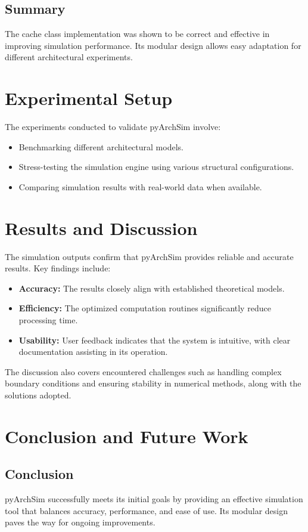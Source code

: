 \documentclass[12pt,a4paper]{report}
\begin{document}
\subsection{Summary}
The cache class implementation was shown to be correct and effective in improving simulation performance. Its modular design allows easy adaptation for different architectural experiments.

\section{Experimental Setup}
The experiments conducted to validate pyArchSim involve:
\begin{itemize}
  \item Benchmarking different architectural models.
  \item Stress-testing the simulation engine using various structural configurations.
  \item Comparing simulation results with real-world data when available.
\end{itemize}

\section{Results and Discussion}
The simulation outputs confirm that pyArchSim provides reliable and accurate results. Key findings include:
\begin{itemize}
  \item \textbf{Accuracy:} The results closely align with established theoretical models.
  \item \textbf{Efficiency:} The optimized computation routines significantly reduce processing time.
  \item \textbf{Usability:} User feedback indicates that the system is intuitive, with clear documentation assisting in its operation.
\end{itemize}

The discussion also covers encountered challenges such as handling complex boundary conditions and ensuring stability in numerical methods, along with the solutions adopted.

\section{Conclusion and Future Work}
\subsection{Conclusion}
pyArchSim successfully meets its initial goals by providing an effective simulation tool that balances accuracy, performance, and ease of use. Its modular design paves the way for ongoing improvements.
\end{document}

